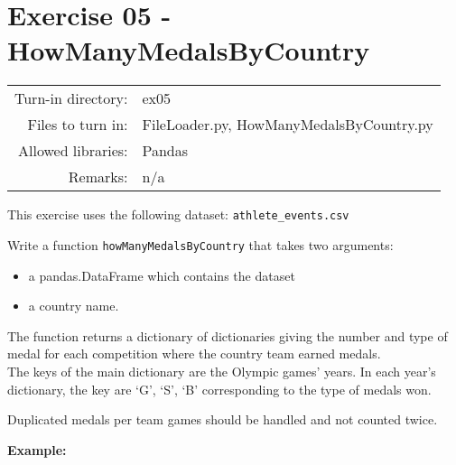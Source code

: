 \documentclass[]{article}
\begin{document}
\clearpage

\hypertarget{exercise-05---howmanymedalsbycountry-1}{%
\section{Exercise 05 -
HowManyMedalsByCountry}\label{exercise-05---howmanymedalsbycountry-1}}

\begin{longtable}[]{@{}rl@{}}
\toprule
\endhead
Turn-in directory: & ex05\tabularnewline
Files to turn in: & FileLoader.py,
HowManyMedalsByCountry.py\tabularnewline
Allowed libraries: & Pandas\tabularnewline
Remarks: & n/a\tabularnewline
\bottomrule
\end{longtable}

This exercise uses the following dataset: \texttt{athlete\_events.csv}

Write a function \texttt{howManyMedalsByCountry} that takes two
arguments:

\begin{itemize}
\item
  a pandas.DataFrame which contains the dataset
\item
  a country name.
\end{itemize}

The function returns a dictionary of dictionaries giving the number and
type of medal for each competition where the country team earned
medals.\\
The keys of the main dictionary are the Olympic games' years. In each
year's dictionary, the key are `G', `S', `B' corresponding to the type
of medals won.

Duplicated medals per team games should be handled and not counted
twice.

\textbf{Example:}
\end{document}
